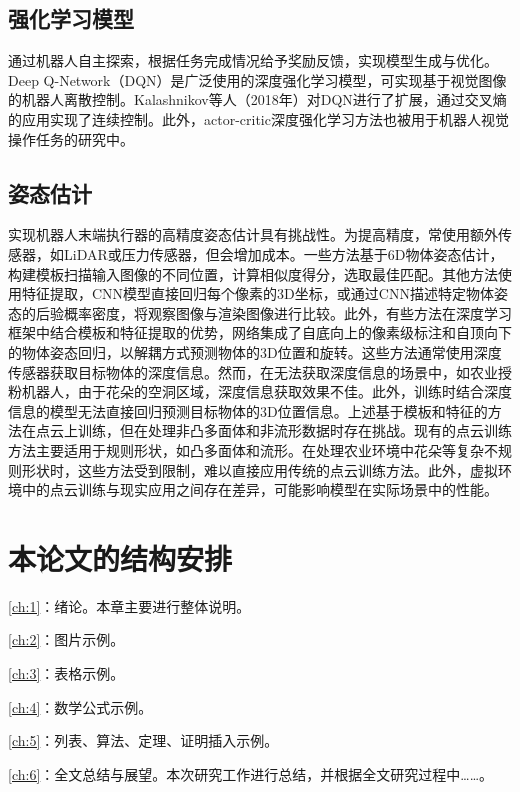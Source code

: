 \subsection{强化学习模型}
通过机器人自主探索，根据任务完成情况给予奖励反馈，实现模型生成与优化。Deep Q-Network（DQN）是广泛使用的深度强化学习模型，可实现基于视觉图像的机器人离散控制。Kalashnikov等人（2018年）对DQN进行了扩展，通过交叉熵的应用实现了连续控制。此外，actor-critic深度强化学习方法也被用于机器人视觉操作任务的研究中。

\subsection{姿态估计}
实现机器人末端执行器的高精度姿态估计具有挑战性。为提高精度，常使用额外传感器，如LiDAR或压力传感器，但会增加成本。一些方法基于6D物体姿态估计，构建模板扫描输入图像的不同位置，计算相似度得分，选取最佳匹配。其他方法使用特征提取，CNN模型直接回归每个像素的3D坐标，或通过CNN描述特定物体姿态的后验概率密度，将观察图像与渲染图像进行比较。此外，有些方法在深度学习框架中结合模板和特征提取的优势，网络集成了自底向上的像素级标注和自顶向下的物体姿态回归，以解耦方式预测物体的3D位置和旋转。这些方法通常使用深度传感器获取目标物体的深度信息。然而，在无法获取深度信息的场景中，如农业授粉机器人，由于花朵的空洞区域，深度信息获取效果不佳。此外，训练时结合深度信息的模型无法直接回归预测目标物体的3D位置信息。上述基于模板和特征的方法在点云上训练，但在处理非凸多面体和非流形数据时存在挑战。现有的点云训练方法主要适用于规则形状，如凸多面体和流形。在处理农业环境中花朵等复杂不规则形状时，这些方法受到限制，难以直接应用传统的点云训练方法。此外，虚拟环境中的点云训练与现实应用之间存在差异，可能影响模型在实际场景中的性能。




\section{本论文的结构安排}
\cref{ch:1}：绪论。本章主要进行整体说明。

\cref{ch:2}：图片示例。

\cref{ch:3}：表格示例。

\cref{ch:4}：数学公式示例。

\cref{ch:5}：列表、算法、定理、证明插入示例。

\cref{ch:6}：全文总结与展望。本次研究工作进行总结，并根据全文研究过程中……。


